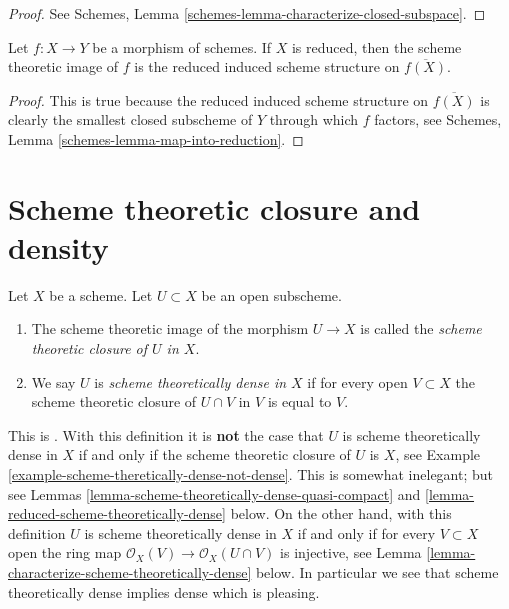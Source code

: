 \begin{proof}
See Schemes, Lemma \ref{schemes-lemma-characterize-closed-subspace}.
\end{proof}

\begin{lemma}
\label{lemma-scheme-theoretic-image-reduced}
Let $f : X \to Y$ be a morphism of schemes.
If $X$ is reduced, then the scheme theoretic image of $f$ is
the reduced induced scheme structure on $\overline{f(X)}$.
\end{lemma}

\begin{proof}
This is true because the reduced induced scheme structure on $\overline{f(X)}$
is clearly the smallest closed subscheme of $Y$ through which $f$ factors,
see
Schemes, Lemma \ref{schemes-lemma-map-into-reduction}.
\end{proof}




\section{Scheme theoretic closure and density}
\label{section-scheme-theoretic-closure}

\begin{definition}
\label{definition-scheme-theoretically-dense}
Let $X$ be a scheme. Let $U \subset X$ be an open subscheme.
\begin{enumerate}
\item The scheme theoretic image of the morphism $U \to X$
is called the {\it scheme theoretic closure of $U$ in $X$}.
\item We say $U$ is {\it scheme theoretically dense in $X$}
if for every open $V \subset X$ the scheme theoretic closure
of $U \cap V$ in $V$ is equal to $V$.
\end{enumerate}
\end{definition}

\noindent
This is \cite[IV, Definition 11.10.2]{EGA}. With this definition it is
{\bf not} the case that $U$ is scheme theoretically dense in $X$ if and
only if the scheme theoretic closure of $U$ is $X$, see
Example \ref{example-scheme-theretically-dense-not-dense}.
This is somewhat inelegant; but see
Lemmas \ref{lemma-scheme-theoretically-dense-quasi-compact}
and
\ref{lemma-reduced-scheme-theoretically-dense}
below. On the other hand, with this definition $U$ is scheme theoretically
dense in $X$ if and only if for every $V \subset X$ open the ring map
$\mathcal{O}_X(V) \to \mathcal{O}_X(U \cap V)$ is injective, see
Lemma \ref{lemma-characterize-scheme-theoretically-dense}
below. In particular we see that scheme theoretically dense implies dense
which is pleasing.

